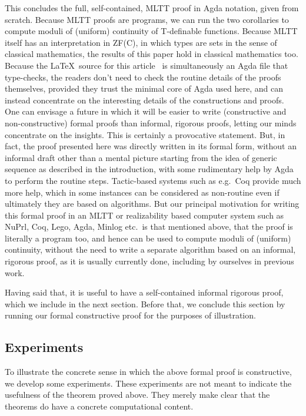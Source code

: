 \documentclass{entcs} \usepackage{prentcsmacro}
\begin{document}
\noindent This concludes the full, self-contained, MLTT proof in Agda
notation, given from scratch. Because MLTT proofs are programs, we can
run the two corollaries to compute moduli of (uniform) continuity of
T-definable functions.  Because MLTT itself has an interpretation in
ZF(C), in which types are sets in the sense of classical mathematics,
the results of this paper hold in classical mathematics too.  Because
the \LaTeX\ source for this article~\cite{escardo:dialogue} is
simultaneously an Agda file that type-checks, the readers don't need
to check the routine details of the proofs themselves, provided they
trust the minimal core of Agda used here, and can instead concentrate
on the interesting details of the constructions and proofs. One can
envisage a future in which it will be easier to write (constructive
and non-constructive) formal proofs than informal, rigorous proofs,
letting our minds concentrate on the insights. This is certainly a
provocative statement. But, in fact, the proof presented here was
directly written in its formal form, without an informal draft other
than a mental picture starting from the idea of generic sequence as
described in the introduction, with some rudimentary help by Agda to
perform the routine steps. Tactic-based systems such as e.g.\ Coq
provide much more help, which in some instances can be considered as
non-routine even if ultimately they are based on algorithms. But our
principal motivation for writing this formal proof in an MLTT or
realizability based computer system such as NuPrl, Coq, Lego, Agda,
Minlog etc.\ is that mentioned above, that the proof is literally a
program too, and hence can be used to compute moduli of (uniform)
continuity, without the need to write a separate algorithm based on an
informal, rigorous proof, as it is usually currently done, including
by ourselves in previous work.

Having said that, it is useful to have a self-contained informal
rigorous proof, which we include in the next section. Before that,
we conclude this section by running our formal constructive proof for
the purposes of illustration.

\subsection{Experiments} \label{section:experiments}

To illustrate the concrete sense in which the above formal proof is
constructive, we develop some experiments. These experiments are not
meant to indicate the usefulness of the theorem proved above. They
merely make clear that the theorems do have a concrete computational
content.
\end{document}
